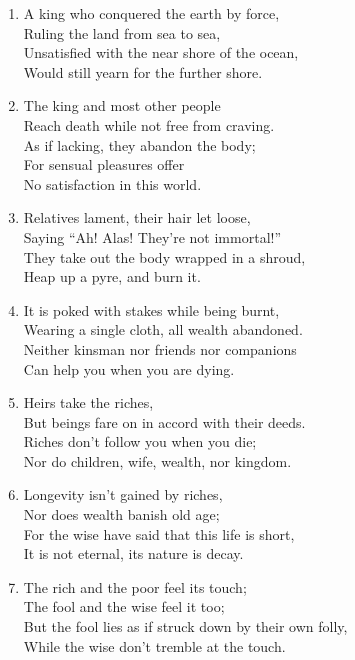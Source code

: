 \documentclass[10pt, openany]{book}
\begin{document}
\begin{enumerate}
\item A king who conquered the earth by force,\\
Ruling the land from sea to sea,\\
Unsatisfied with the near shore of the ocean,\\
Would still yearn for the further shore.

\item The king and most other people\\
Reach death while not free from craving.\\
As if lacking, they abandon the body;\\
For sensual pleasures offer \\
No satisfaction in this world.

\item Relatives lament, their hair let loose,\\
Saying “Ah! Alas! They’re not immortal!”\\
They take out the body wrapped in a shroud,\\
Heap up a pyre, and burn it.

\item It is poked with stakes while being burnt,\\
Wearing a single cloth, all wealth abandoned.\\
Neither kinsman nor friends nor companions\\
Can help you when you are dying.

\item Heirs take the riches,\\
But beings fare on in accord with their deeds.\\
Riches don’t follow you when you die;\\
Nor do children, wife, wealth, nor kingdom.

\item Longevity isn’t gained by riches,\\
Nor does wealth banish old age;\\
For the wise have said that this life is short,\\
It is not eternal, its nature is decay.

\item The rich and the poor feel its touch;\\
The fool and the wise feel it too;\\
But the fool lies as if struck down by their own folly,\\
While the wise don’t tremble at the touch.


\end{enumerate}
\end{document}
